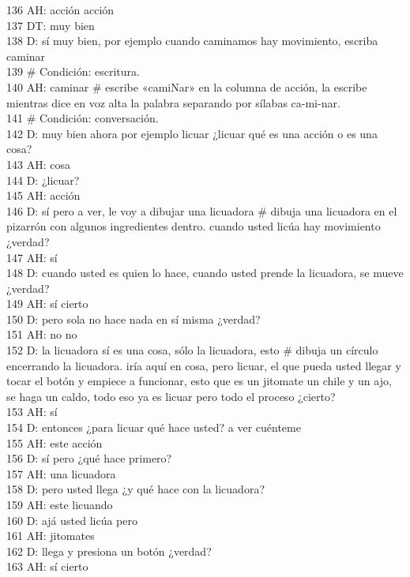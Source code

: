 136 AH: acción acción\\
137 DT: muy bien\\
138 D: sí muy bien, por ejemplo cuando caminamos hay movimiento, escriba caminar\\
139 \# Condición: escritura.\\
140 AH: caminar \# escribe «camiNar» en la columna de acción, la escribe mientras dice en voz alta la palabra separando por sílabas ca-mi-nar.\\
141 \# Condición: conversación.\\
142 D: muy bien ahora por ejemplo licuar ¿licuar qué es una acción o es una cosa?\\
143 AH: cosa\\
144 D: ¿licuar?\\
145 AH: acción\\
146 D: sí pero a ver, le voy a dibujar una licuadora \# dibuja una licuadora en el pizarrón con algunos ingredientes dentro. cuando usted licúa hay movimiento ¿verdad?\\
147 AH: sí\\
148 D: cuando usted es quien lo hace, cuando usted prende la licuadora, se mueve ¿verdad?\\
149 AH: sí cierto\\
150 D: pero sola no hace nada en sí misma ¿verdad?\\
151 AH: no no\\
152 D: la licuadora sí es una cosa, sólo la licuadora, esto \# dibuja un círculo encerrando la licuadora. iría aquí en cosa, pero licuar, el que pueda usted llegar y tocar el botón y empiece a funcionar, esto que es un jitomate un chile y un ajo, se haga un caldo, todo eso ya es licuar pero todo el proceso ¿cierto?\\
153 AH: sí\\
154 D: entonces ¿para licuar qué hace usted? a ver cuénteme\\
155 AH: este acción\\
156 D: sí pero ¿qué hace primero?\\
157 AH: una licuadora\\
158 D: pero usted llega ¿y qué hace con la licuadora?\\
159 AH: este licuando\\
160 D: ajá usted licúa pero\\
161 AH: jitomates\\
162 D: llega y presiona un botón ¿verdad?\\
163 AH: sí cierto\\

